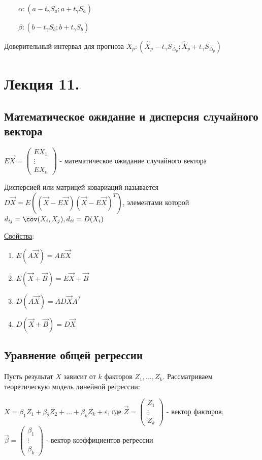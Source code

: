 \documentclass[12pt]{article}
\begin{document}
$\qquad \alpha: (a - t_\gamma S_a; a + t_\gamma S_a)$

$\qquad \beta: (b - t_\gamma S_b; b + t_\gamma S_b)$

Доверительный интервал для прогноза $X_p: (\hat X_p - t_\gamma S_{\Delta_p}; \hat X_p + t_\gamma S_{\Delta_p})$








\section{Лекция 11.}

\subsection{Математическое ожидание и дисперсия случайного вектора}

\Def $E \vec X = \begin{pmatrix}E X_1 \\ \vdots \\ E X_n \end{pmatrix}$ - математическое ожидание случайного вектора

\Def Дисперсией или матрицей ковариаций называется $D \vec X = E ((\vec X - E \vec X) (\vec X - E \vec X)^T )$, 
элементами которой $d_{ij} = \cov (X_i, X_j), d_{ii} = D(X_i)$

\underline{Свойства}:

\begin{enumerate}
    \item $E(A \vec X) = A E \vec X$
    \item $E(\vec X + \vec B) = E \vec X + \vec B$
    \item $D(A \vec X) = A D \vec X A^T$
    \item $D(\vec X + \vec B) = D \vec X$
\end{enumerate}

\subsection{Уравнение общей регрессии}

Пусть результат $X$ зависит от $k$ факторов $Z_1, \dots, Z_k$. Рассматриваем теоретическую модель линейной регрессии:

$X = \beta_1 Z_1 + \beta_2 Z_2 + \dots + \beta_k Z_k + \varepsilon$, где $\vec Z = \begin{pmatrix}Z_1 \\ \vdots \\ Z_k \end{pmatrix}$ - вектор факторов, $\vec \beta = \begin{pmatrix}\beta_1 \\ \vdots \\ \beta_k \end{pmatrix}$ - вектор коэффициентов регрессии
\end{document}

